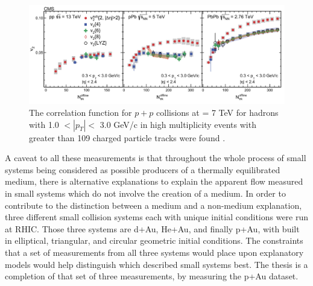 \begin{figure}[h!]
\begin{center}
\includegraphics[width=0.9\linewidth]{figs/pp_pPb_PbPb_cumulants.PNG}
\caption{ The correlation function for $p+p$ collisions at \sqsn = 7 TeV for hadrons with 1.0 $<|p_T|<$ 3.0 GeV/c in high multiplicity events with greater than 109 charged particle tracks were found \cite{Khachatryan2010}.}
\label{fig:pp_ridge_plot}
\end{center}
\end{figure}



A caveat to all these measurements is that throughout the whole process of small systems being considered as possible producers of a thermally equilibrated medium, there is alternative explanations to explain the apparent flow measured in small systems which do not involve the creation of a medium. In order to contribute to the distinction between a medium and a non-medium explanation, three different small collision systems each with unique initial conditions were run at RHIC. Those three systems are d+Au, He+Au, and finally p+Au, with built in elliptical, triangular, and circular geometric initial conditions. The constraints that a set of measurements from all three systems would place upon explanatory models would help distinguish which described small systems best. The thesis is a completion of that set of three measurements, by measuring the p+Au dataset. 



